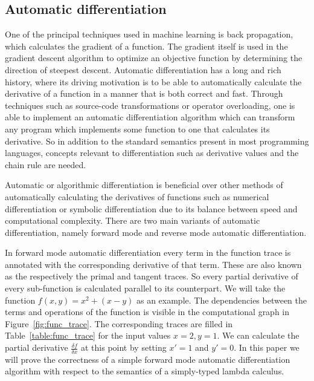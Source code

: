 \documentclass[11pt, final]{article}
\begin{document}
\subsection{Automatic differentiation}


One of the principal techniques used in machine learning is back propagation, which calculates the gradient of a function. The gradient itself is used in the gradient descent algorithm to optimize an objective function by determining the direction of steepest descent\cite{Baydin2015AutomaticDI}.
Automatic differentiation has a long and rich history, where its driving motivation is to be able to automatically calculate the derivative of a function in a manner that is both correct and fast.
Through techniques such as source-code transformations or operator overloading, one is able to implement an automatic differentiation algorithm which can transform any program which implements some function to one that calculates its derivative.
So in addition to the standard semantics present in most programming languages, concepts relevant to differentiation such as derivative values and the chain rule are needed.

Automatic or algorithmic differentiation is beneficial over other methods of automatically calculating the derivatives of functions such as numerical differentiation or symbolic differentiation due to its balance between speed and computational complexity.
There are two main variants of automatic differentiation, namely forward mode and reverse mode automatic differentiation.

In forward mode automatic differentiation every term in the function trace is annotated with the corresponding derivative of that term. These are also known as the respectively the primal and tangent traces. So every partial derivative of every sub-function is calculated parallel to its counterpart. We will take the function $f(x, y) = x^2 + (x - y)$ as an example. The dependencies between the terms and operations of the function is visible in the computational graph in Figure~\ref{fig:func_trace}. The corresponding traces are filled in Table~\ref{table:func_trace} for the input values $x = 2, y = 1$. We can calculate the partial derivative $\frac{\delta f}{\delta x}$ at this point by setting $x' = 1$ and $y' = 0$. In this paper we will prove the correctness of a simple forward mode automatic differentiation algorithm with respect to the semantics of a simply-typed lambda calculus.
\end{document}
